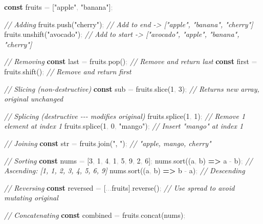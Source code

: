 \documentclass[
  justified,
  openright,
]{tufte-book}
\newcommand{\KeywordTok}[1]{\textcolor{CodeKeyword}{\textbf{#1}}}  %
\newcommand{\StringTok}[1]{\textcolor{CodeString}{#1}}              %
\newcommand{\CommentTok}[1]{\textcolor{CodeComment}{\textit{#1}}}  %
\newcommand{\CodeNumTok}[1]{\textcolor{CodeNumber}{#1}}             %
\newcommand{\CodeFuncTok}[1]{\textcolor{CodeKeyword}{#1}}           %
\newcommand{\OperatorTok}[1]{\textcolor{DarkGray}{#1}}              %
\newenvironment{Shaded}{%
  \begin{mdframed}[style=TufteCode]%
}{%
  \end{mdframed}%
}
\begin{document}
\begin{Shaded}
\begin{Highlighting}[]
\KeywordTok{const} fruits \OperatorTok{=} [\StringTok{"apple"}\OperatorTok{,} \StringTok{"banana"}]\OperatorTok{;}
 
\CommentTok{// Adding}
fruits\OperatorTok{.}\CodeFuncTok{push}(\StringTok{"cherry"})\OperatorTok{;} \CommentTok{// Add to end {-}\textgreater{} ["apple", "banana", "cherry"]}
fruits\OperatorTok{.}\CodeFuncTok{unshift}(\StringTok{"avocado"})\OperatorTok{;} \CommentTok{// Add to start {-}\textgreater{} ["avocado", "apple", "banana", "cherry"]}
 
\CommentTok{// Removing}
\KeywordTok{const} last \OperatorTok{=} fruits\OperatorTok{.}\CodeFuncTok{pop}()\OperatorTok{;} \CommentTok{// Remove and return last}
\KeywordTok{const} first \OperatorTok{=} fruits\OperatorTok{.}\CodeFuncTok{shift}()\OperatorTok{;} \CommentTok{// Remove and return first}
 
\CommentTok{// Slicing (non{-}destructive)}
\KeywordTok{const} sub \OperatorTok{=} fruits\OperatorTok{.}\CodeFuncTok{slice}(\CodeNumTok{1}\OperatorTok{,} \CodeNumTok{3})\OperatorTok{;} \CommentTok{// Returns new array, original unchanged}
 
\CommentTok{// Splicing (destructive {-}{-}{-} modifies original)}
fruits\OperatorTok{.}\CodeFuncTok{splice}(\CodeNumTok{1}\OperatorTok{,} \CodeNumTok{1})\OperatorTok{;} \CommentTok{// Remove 1 element at index 1}
fruits\OperatorTok{.}\CodeFuncTok{splice}(\CodeNumTok{1}\OperatorTok{,} \CodeNumTok{0}\OperatorTok{,} \StringTok{"mango"})\OperatorTok{;} \CommentTok{// Insert "mango" at index 1}
 
\CommentTok{// Joining}
\KeywordTok{const} str \OperatorTok{=} fruits\OperatorTok{.}\CodeFuncTok{join}(\StringTok{", "})\OperatorTok{;} \CommentTok{// "apple, mango, cherry"}
 
\CommentTok{// Sorting}
\KeywordTok{const} nums \OperatorTok{=} [\CodeNumTok{3}\OperatorTok{,} \CodeNumTok{1}\OperatorTok{,} \CodeNumTok{4}\OperatorTok{,} \CodeNumTok{1}\OperatorTok{,} \CodeNumTok{5}\OperatorTok{,} \CodeNumTok{9}\OperatorTok{,} \CodeNumTok{2}\OperatorTok{,} \CodeNumTok{6}]\OperatorTok{;}
nums\OperatorTok{.}\CodeFuncTok{sort}((a\OperatorTok{,} b) \KeywordTok{=\textgreater{}} a \OperatorTok{{-}} b)\OperatorTok{;} \CommentTok{// Ascending: [1, 1, 2, 3, 4, 5, 6, 9]}
nums\OperatorTok{.}\CodeFuncTok{sort}((a\OperatorTok{,} b) \KeywordTok{=\textgreater{}} b \OperatorTok{{-}} a)\OperatorTok{;} \CommentTok{// Descending}
 
\CommentTok{// Reversing}
\KeywordTok{const} reversed \OperatorTok{=} [\OperatorTok{...}fruits]\OperatorTok{.}\CodeFuncTok{reverse}()\OperatorTok{;} \CommentTok{// Use spread to avoid mutating original}
 
\CommentTok{// Concatenating}
\KeywordTok{const} combined \OperatorTok{=} fruits\OperatorTok{.}\CodeFuncTok{concat}(nums)\OperatorTok{;}
\end{Highlighting}
\end{Shaded}
\end{document}
